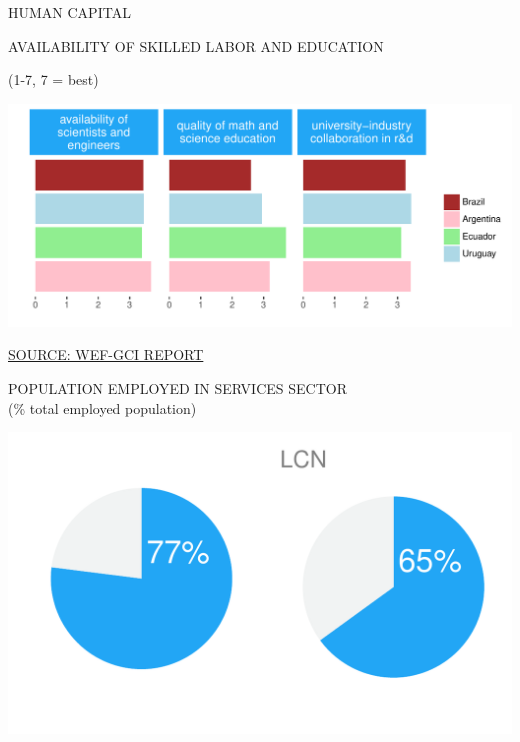 \documentclass{article}\usepackage[]{graphicx}\usepackage[]{color}
\makeatletter
\def\maxwidth{ %
  \ifdim\Gin@nat@width>\linewidth
    \linewidth
  \else
    \Gin@nat@width
  \fi
}
\makeatother
\begin{document}
\begin{minipage}[b]{0.95\textwidth}
   \vspace{5ex}
   \begin{flushleft}  
     \hspace{4ex}\Large{\textcolor[HTML]{22A6F5}{HUMAN CAPITAL}}
   \end{flushleft} 
  \begin{minipage}[c]{0.55\textwidth} %
    \hspace{4ex}\small{\textcolor[HTML]{818181}{AVAILABILITY OF SKILLED LABOR AND EDUCATION}} 
    
    \hspace{4ex}\footnotesize{\textcolor[HTML]{818181}{(1-7, 7 = best)}}


\hfill{}\includegraphics[width=\maxwidth]{figure/bar_facewrap_chart_Human-1} 



    \hspace{4ex}\scriptsize{\href{http://www3.weforum.org/docs/gcr/2015-2016/GCI_Dataset_2006-2015.xlsx}{\textcolor[HTML]{22A6F5}{SOURCE: WEF-GCI REPORT}}}
  \end{minipage}
  \begin{minipage}[c]{0.43\textwidth} %
    \small{\textcolor[HTML]{818181}{POPULATION EMPLOYED IN SERVICES SECTOR \\ \footnotesize(\% total employed population)}}
    \vspace{-2ex}


{\centering \includegraphics[width=\maxwidth]{figure/pie_chart_double_Human-1} 

}
\end{minipage}
\end{minipage}
\end{document}
